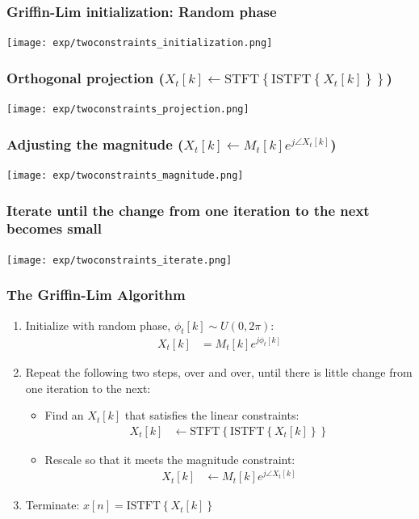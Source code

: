 \documentclass{beamer}
\begin{document}
  
\begin{frame}
  \frametitle{Griffin-Lim initialization: Random phase}
  \centerline{\texttt{[image: exp/twoconstraints\_initialization.png]}}  
\end{frame}

\begin{frame}
  \frametitle{Orthogonal projection ($X_t[k]\leftarrow\text{STFT}\left\{\text{ISTFT}\left\{X_t[k]\right\}\right\}$)}
  \centerline{\texttt{[image: exp/twoconstraints\_projection.png]}}  
\end{frame}

\begin{frame}
  \frametitle{Adjusting the magnitude ($X_t[k]\leftarrow M_t[k]e^{j\angle X_t[k]}$)}
  \centerline{\texttt{[image: exp/twoconstraints\_magnitude.png]}}  
\end{frame}

\begin{frame}
  \frametitle{Iterate until the change from one iteration to the next becomes small}
  \centerline{\texttt{[image: exp/twoconstraints\_iterate.png]}}  
\end{frame}

\begin{frame}
  \frametitle{The Griffin-Lim Algorithm}

  \begin{enumerate}
  \item Initialize with random phase, $\phi_t[k]\sim U(0,2\pi)$:
    \begin{align*}
      X_t[k] &= M_t[k]e^{j\phi_t[k]}
    \end{align*}
  \item Repeat the following two steps, over and over, until there is
    little change from one iteration to the next:
    \begin{itemize}
    \item Find an $X_t[k]$ that satisfies the linear constraints:
      \begin{align*}
        X_t[k] &\leftarrow \text{STFT}\left\{\text{ISTFT}\left\{X_t[k]\right\}\right\}
      \end{align*}
    \item Rescale so that it meets the magnitude constraint:
      \begin{align*}
        X_t[k] &\leftarrow M_t[k]e^{j\angle X_t[k]}
      \end{align*}
    \end{itemize}
    \item Terminate: $x[n]=\text{ISTFT}\left\{X_t[k]\right\}$
  \end{enumerate}
\end{frame}
\end{document}
